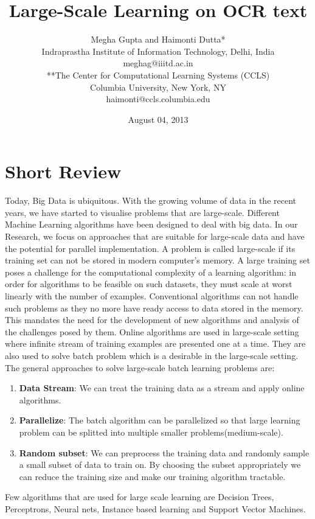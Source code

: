 \documentclass{article}
\title{Large-Scale Learning on OCR text}
\author{Megha Gupta and Haimonti Dutta*\\
Indraprastha Institute of Information Technology, Delhi, India \\
meghag@iiitd.ac.in \\
**The Center for Computational Learning Systems (CCLS) \\
Columbia University, New York, NY \\
haimonti@ccls.columbia.edu \\
}
\date{August 04, 2013}
\begin{document}
\maketitle

\section{Short Review}
Today, Big Data is ubiquitous. With the growing volume of data in the recent years, we have started to visualise problems that are large-scale. Different Machine Learning algorithms have been designed to deal with big data.  In our Research, we focus on approaches that are suitable for large-scale data and have the potential for parallel implementation. A problem is called large-scale if its training set can not be stored in modern computer's memory. A large training set poses a challenge for the computational complexity of a learning algorithm: in order for algorithms to be feasible on such datasets, they must scale at
worst linearly with the number of examples. Conventional algorithms can not handle such problems as they no more have ready access to data stored in the memory. This mandates the need for the development of new algorithms and analysis of the challenges posed by them.
Online algorithms are used in large-scale setting where infinite stream of training examples are presented one at a time. They are also used to solve batch problem which is a desirable in the large-scale setting. The general approaches to solve large-scale batch learning problems are:
\begin{enumerate}
\item \textbf{Data Stream}: We can treat the training data as a stream and apply online algorithms.
\item \textbf{Parallelize}: The batch algorithm can be parallelized so that large learning problem can be splitted into multiple smaller problems(medium-scale).
\item \textbf{Random subset}: We can preprocess the training data and randomly sample a small subset of data to train on. By choosing the subset appropriately we can reduce the training size and make our training algorithm tractable.
\end{enumerate}
Few algorithms that are used for large scale learning are Decision Trees, Perceptrons, Neural nets, Instance based learning and Support Vector Machines.\\
\end{document}
